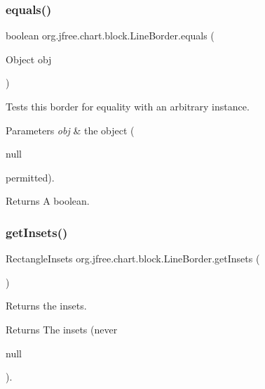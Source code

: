 \mbox{\label{classorg_1_1jfree_1_1chart_1_1block_1_1_line_border_a8a85f237d8099f6141229a6466f38037}} 
\subsubsection{\texorpdfstring{equals()}{equals()}}
{\footnotesize\ttfamily boolean org.\+jfree.\+chart.\+block.\+Line\+Border.\+equals (\begin{DoxyParamCaption}\item[{Object}]{obj }\end{DoxyParamCaption})}

Tests this border for equality with an arbitrary instance.


\begin{DoxyParams}{Parameters}
{\em obj} & the object (
\begin{DoxyCode}
null 
\end{DoxyCode}
 permitted).\\
\hline
\end{DoxyParams}
\begin{DoxyReturn}{Returns}
A boolean. 
\end{DoxyReturn}
\mbox{\label{classorg_1_1jfree_1_1chart_1_1block_1_1_line_border_a9487885ccbfa1805c3912fafd6e27d5e}} 
\subsubsection{\texorpdfstring{get\+Insets()}{getInsets()}}
{\footnotesize\ttfamily Rectangle\+Insets org.\+jfree.\+chart.\+block.\+Line\+Border.\+get\+Insets (\begin{DoxyParamCaption}{ }\end{DoxyParamCaption})}

Returns the insets.

\begin{DoxyReturn}{Returns}
The insets (never
\begin{DoxyCode}
null 
\end{DoxyCode}
 ). 
\end{DoxyReturn}


